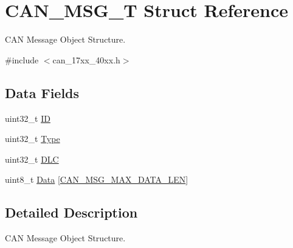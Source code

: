 \hypertarget{structCAN__MSG__T}{\section{C\-A\-N\-\_\-\-M\-S\-G\-\_\-\-T Struct Reference}
\label{structCAN__MSG__T}
}


C\-A\-N Message Object Structure.  




{\ttfamily \#include $<$can\-\_\-17xx\-\_\-40xx.\-h$>$}

\subsection*{Data Fields}
\begin{DoxyCompactItemize}
\item 
uint32\-\_\-t \hyperlink{structCAN__MSG__T_a7fbb2453bed19c5b143fb7336a697622}{I\-D}
\item 
uint32\-\_\-t \hyperlink{structCAN__MSG__T_a2c15ca6deba6d985f7d8d24caec2fb3b}{Type}
\item 
uint32\-\_\-t \hyperlink{structCAN__MSG__T_a39963b19d3cb9885a5e984a6805f2674}{D\-L\-C}
\item 
uint8\-\_\-t \hyperlink{structCAN__MSG__T_adb227f0afb0c340bdc92b4098c2734de}{Data} \mbox{[}\hyperlink{group__CAN__17XX__40XX_gafef54df2cd501083697e84c64614ffca}{C\-A\-N\-\_\-\-M\-S\-G\-\_\-\-M\-A\-X\-\_\-\-D\-A\-T\-A\-\_\-\-L\-E\-N}\mbox{]}
\end{DoxyCompactItemize}


\subsection{Detailed Description}
C\-A\-N Message Object Structure. 

